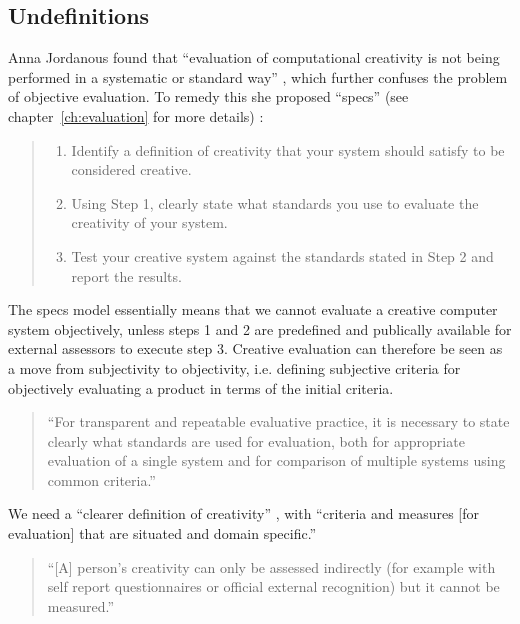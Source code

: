 

\subsection{Undefinitions}

Anna Jordanous found that ``evaluation of computational creativity is not being performed in a systematic or standard way'' \autocite{Jordanous2011}, which further confuses the problem of objective evaluation. To remedy this she proposed ``\gls{specs}'' (see chapter~\ref{ch:evaluation} for more details) \autocite{Jordanous2012a}:

\begin{quote}
  \begin{enumerate}
    \item Identify a definition of creativity that your system should satisfy to be considered creative.
    \item Using Step 1, clearly state what standards you use to evaluate the creativity of your system.
    \item Test your creative system against the standards stated in Step 2 and report the results.
  \end{enumerate}
\end{quote}

The \gls{specs} model essentially means that we cannot evaluate a creative computer system objectively, unless steps 1 and 2 are predefined and publically available for external assessors to execute step 3. Creative evaluation can therefore be seen as a move from subjectivity to objectivity, i.e. defining subjective criteria for objectively evaluating a product in terms of the initial criteria.

\begin{quotation}
  ``For transparent and repeatable evaluative practice, it is necessary to state clearly what standards are used for evaluation, both for appropriate evaluation of a single system and for comparison of multiple systems using common criteria.'' 
\end{quotation}

We need a ``clearer definition of creativity'' \autocite[p.459]{Mayer1999}, with ``criteria and measures [for evaluation] that are situated and domain specific.'' \autocite[p.7]{Candy2012}

\begin{quotation}
  ``[A] person's creativity can only be assessed indirectly (for example with self report questionnaires or official external recognition) but it cannot be measured.'' 
\end{quotation}

